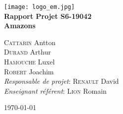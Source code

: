 \begin{titlepage}
    \begin{center}
        \vspace*{\fill}

        \texttt{[image: logo\_em.jpg]}~\\[3cm]
        
        {\Huge \bfseries Rapport Projet S6-19042\\Amazons\\[0.5cm]}
        
        \large \textsc{Cattarin} Antton \\ \textsc{Durand} Arthur \\ \textsc{Hamouche} Luxel \\ \textsc{Robert} Joachim \\[3cm]
        
        \large
        \emph{Responsable de projet}: \textsc{Renault} David \\
        \emph{Enseignant référent}: \textsc{Lion} Romain
        
        \vspace*{\fill}
        
        \large \today
    \end{center}
\end{titlepage}